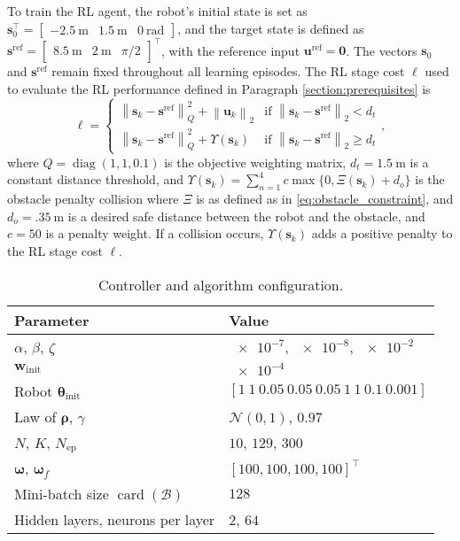 \documentclass[letterpaper, 10pt, conference]{ieeeconf}
\begin{document}
To train the RL agent, the robot's initial state is set as $\mathbf{s}_0^{\top} = \begin{bmatrix}\SI{-2.5}{\meter} & \SI{1.5}{\meter} & \SI{0}{\radian}\end{bmatrix}$, and the target state is defined as $\mathbf{s}^{\text{ref}} = \begin{bmatrix}\SI{8.5}{\meter} & \SI{2}{\meter} & \pi/2\end{bmatrix}^{\top}$, with the reference input $\mathbf{u}^{\text{ref}} = \boldsymbol{0}$.
The vectors $\mathbf{s}_0$ and $\mathbf{s}^{\text{ref}}$ remain fixed throughout all learning episodes.
The RL stage cost $\ell$ used to evaluate the RL performance defined in Paragraph \ref{section:prerequisites} is
\begin{equation} \label{eq:RL_stage_cost}
	\ell = \begin{cases}
		\left\|\mathbf{s}_k - \mathbf{s}^{\text{ref}}\right\|_Q^2 + \left\|\mathbf{u}_k\right\|_2 & \text{if }\left\|\mathbf{s}_k-\mathbf{s}^{\text{ref}}\right\|_2 < d_t\\
		\left\|\mathbf{s}_k-\mathbf{s}^{\text{ref}}\right\|_Q^2 + \Upsilon(\mathbf{s}_k) & \text{if }\left\|\mathbf{s}_k-\mathbf{s}^{\text{ref}}\right\|_2 \geq d_t
	\end{cases},
\end{equation}
where $Q = \operatorname{diag}(1, 1, 0.1)$ is the objective weighting  matrix, $d_t = \SI{1.5}{\meter}$ is a constant distance threshold, and $\Upsilon(\mathbf{s}_k) = \sum_{n = 1}^{4} c\max\{0, \Xi(\mathbf{s}_k) + d_o\}$ is the obstacle penalty collision where $\Xi$ is as defined as in \eqref{eq:obstacle_constraint}, and $d_o = \SI{.35}{\meter}$ is a desired safe distance between the robot and the obstacle, and $c = 50$ is a penalty weight.
If a collision occurs, $\Upsilon(\mathbf{s}_k)$ adds a positive penalty to the RL stage cost $\ell$.
\begin{table}[!tb]
	\caption{Controller and algorithm configuration.}
	\label{algo_params}
	\centering
	\begin{tabular}{ll}
	\hline
		Parameter & Value\\
	\hline
		$\alpha$, $\beta$, $\zeta$  				      & $\num{e-7}$, $\num{e-8}$, $\num{e-2}$\\
		$\mathbf{w}_{\text{init}}$                  & $\num{e-4}$\\
		Robot $\boldsymbol{\theta}_{\text{init}}$             & $[1\ 1\ 0.05\ 0.05\ 0.05\ 1\ 1\ 0.1\ 0.001]$ \\
		Law of $\boldsymbol{\rho}$, $\gamma$                 & $\mathcal{N}(0, \num{1})$, $0.97$\\
		$N$, $K$, $N_{\text{ep}}$   		                 & $10$, $129$, $300$\\
		$\boldsymbol{\omega}$, $\boldsymbol{\omega}_f$			& $[100,100,100,100]^{\top}$\\

		Mini-batch size $\operatorname{card}(\mathcal{B})$               & $128$\\
		Hidden layers, neurons per layer                                & $2$, $64$\\
	\hline
	\end{tabular}
\end{table}
\end{document}
